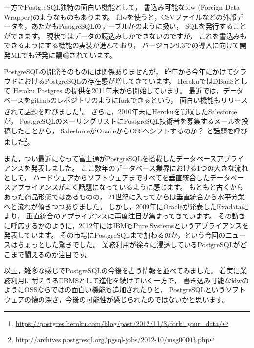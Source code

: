 一方でPostgreSQL独特の面白い機能として，
書込み可能なfdw (Foreign Data Wrapper)のようなものもあります。
fdwを使うと，CSVファイルなどの外部データを，あたかもPostgreSQLのテーブルかのように扱い，
SQLを発行することができます。
現状ではデータの読込みしかできないのですが，
これを書込みもできるようにする機能の実装が進んでおり，
バージョン9.3での導入に向けて開発MLでも活発に議論されています。

PostgreSQLの開発そのものには関係ありませんが，
昨年から今年にかけてクラウドにおけるPostgreSQLの存在感が増してきています。
HerokuではDBaaSとして Heroku Postgres の提供を2011年末から開始しています。
最近では，データベースをgithubのレポジトリのようにforkできるという，
面白い機能もリリースされて話題を呼びました\footnote{\url{https://postgres.heroku.com/blog/past/2012/11/8/fork_your_data/}}。
さらに，2010年末にHerokuを買収したSalesforceが，
PostgreSQLのメーリングリストにPostgreSQL技術者を募集するメールを投稿したことから，
SalesforceがOracleからOSSへシフトするのか？
と話題を呼びました\footnote{\url{http://archives.postgresql.org/pgsql-jobs/2012-10/msg00003.php}}。

また，つい最近になって富士通がPostgreSQLを搭載したデータベースアプライアンスを発表しました。
ここ数年のデータベース業界における1つの大きな流れとして，
ハードウェアからソフトウェアまですべてを垂直統合したデータベースアプライアンスがよく話題になっているように感じます。
もともと古くからあった商品形態ではあるものの，
21世紀に入ってからは垂直統合から水平分業へと流れが傾きつつありました。
しかし，2009年にOracleが発表したExadataにより，
垂直統合のアプライアンスに再度注目が集まってきています。
その動きに呼応するかのように，2012年にはIBMもPure Systemsというアプライアンスを発表しています。
その市場にPostgreSQLまで加わるのか，という今回のニュースはちょっとした驚きでした。
業務利用が徐々に浸透しているPostgreSQLがどこまで闘えるのか注目です。

以上，雑多な感じでPostgreSQLの今後を占う情報を並べてみました。
着実に業務利用に耐えうるDBMSとして進化を続けていく一方で，
書き込み可能なfdwのようにOSSならではの面白い機能も追加されたりと，
PostgreSQLというソフトウェアの懐の深さ，今後の可能性が感じられたのではないかと思います。
